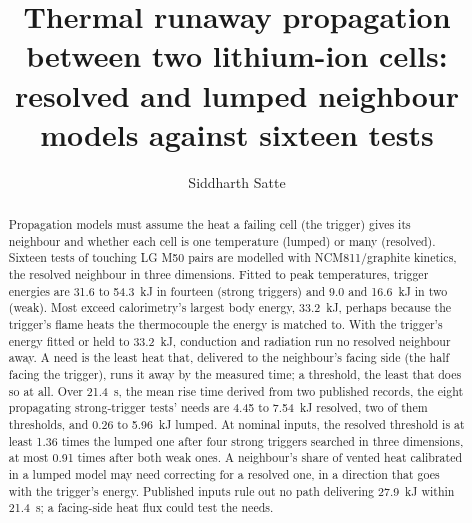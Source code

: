 \documentclass[preprint,12pt]{elsarticle}
\begin{document}
\begin{frontmatter}

\title{Thermal runaway propagation between two lithium-ion cells: resolved and lumped neighbour models against sixteen tests}

\author{Siddharth Satte}
\address{Independent researcher, Pune, India}

\begin{abstract}
\ifdefined\JESabstract
Propagation models must assume the heat a failing cell (the trigger) gives its neighbour and whether each cell is one temperature (lumped) or many (resolved). Sixteen tests of touching LG M50 pairs are modelled with NCM811/graphite kinetics, the resolved neighbour in three dimensions. Fitted to peak temperatures, trigger energies are 31.6 to 54.3~kJ in fourteen (strong triggers) and 9.0 and 16.6~kJ in two (weak). Most exceed calorimetry's largest body energy, 33.2~kJ, perhaps because the trigger's flame heats the thermocouple the energy is matched to. With the trigger's energy fitted or held to 33.2~kJ, conduction and radiation run no resolved neighbour away. A need is the least heat that, delivered to the neighbour's facing side (the half facing the trigger), runs it away by the measured time; a threshold, the least that does so at all. Over 21.4~s, the mean rise time derived from two published records, the eight propagating strong-trigger tests' needs are 4.45 to 7.54~kJ resolved, two of them thresholds, and 0.26 to 5.96~kJ lumped. At nominal inputs, the resolved threshold is at least 1.36 times the lumped one after four strong triggers searched in three dimensions, at most 0.91 times after both weak ones. A neighbour's share of vented heat calibrated in a lumped model may need correcting for a resolved one, in a direction that goes with the trigger's energy. Published inputs rule out no path delivering 27.9~kJ within 21.4~s; a facing-side heat flux could test the needs.
\else

\end{abstract}
\end{frontmatter}
\end{document}
